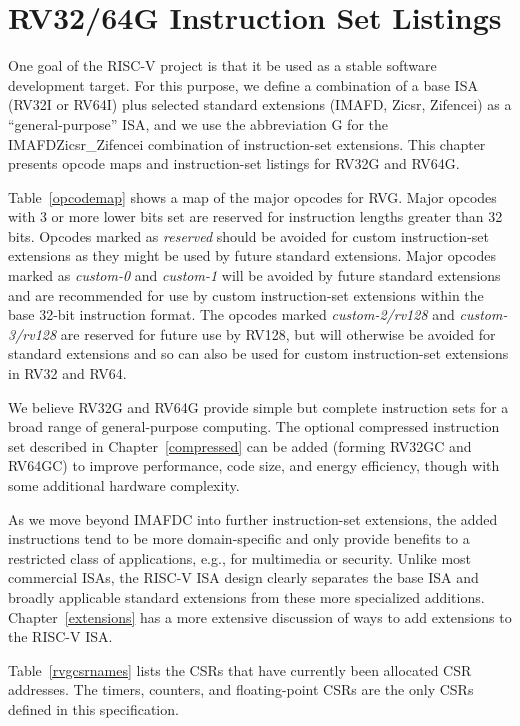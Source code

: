 \chapter{RV32/64G Instruction Set Listings}

One goal of the RISC-V project is that it be used as a stable software
development target.  For this purpose, we define a combination of a
base ISA (RV32I or RV64I) plus selected standard extensions (IMAFD, Zicsr, Zifencei) as
a ``general-purpose'' ISA, and we use the abbreviation G for the IMAFDZicsr\_Zifencei
combination of instruction-set extensions.    This chapter presents
opcode maps and instruction-set listings for RV32G and RV64G.



Table~\ref{opcodemap} shows a map of the major opcodes for RVG.  Major
opcodes with 3 or more lower bits set are reserved for instruction
lengths greater than 32 bits.  Opcodes marked as {\em reserved} should
be avoided for custom instruction-set extensions as they might be used
by future standard extensions.  Major opcodes marked as {\em custom-0}
and {\em custom-1} will be avoided by future standard extensions and
are recommended for use by custom instruction-set extensions within
the base 32-bit instruction format.  The opcodes marked {\em
  custom-2/rv128} and {\em custom-3/rv128} are reserved for future use
by RV128, but will otherwise be avoided for standard extensions and so
can also be used for custom instruction-set extensions in RV32 and
RV64.

We believe RV32G and RV64G provide simple but complete instruction
sets for a broad range of general-purpose computing.  The optional
compressed instruction set described in Chapter~\ref{compressed} can
be added (forming RV32GC and RV64GC) to improve performance, code
size, and energy efficiency, though with some additional hardware
complexity.

As we move beyond IMAFDC into further instruction-set extensions, the
added instructions tend to be more domain-specific and only provide
benefits to a restricted class of applications, e.g., for multimedia
or security.  Unlike most commercial ISAs, the RISC-V ISA design
clearly separates the base ISA and broadly applicable standard
extensions from these more specialized additions.
Chapter~\ref{extensions} has a more extensive discussion of ways to
add extensions to the RISC-V ISA.



\FloatBarrier
Table~\ref{rvgcsrnames} lists the CSRs that have
currently been allocated CSR addresses.  The timers, counters, and
floating-point CSRs are the only CSRs defined in this specification.


